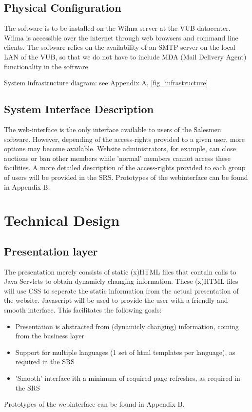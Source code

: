 \documentclass[a4paper, 12pt]{report}
\begin{document}
\section{Physical Configuration}
The software is to be installed on the Wilma server at the VUB datacenter. Wilma is accessible over the internet through web browsers and command line clients. The software relies on the availability of an SMTP server on the local LAN of the VUB, so that we do not have to include MDA (Mail Delivery Agent) functionality in the software.

System infrastructure diagram: see Appendix A, \ref{fig_infrastructure}


\section{System Interface Description}
The web-interface is the only interface available to users of the Salesmen software. However, depending of the access-rights provided to a given user, more options may become available. Website administrators, for example, can close auctions or ban other members while 'normal' members cannot access these facilities. A more detailed description of the access-rights provided to each group of users will be provided in the SRS.
Prototypes of the webinterface can be found in Appendix B.
\pagebreak
\chapter{Technical Design \label{Technical Design}}
\section{Presentation layer}
The presentation merely consists of static (x)HTML files that contain calls to Java Servlets to obtain dynamicly changing information. These (x)HTML files will use CSS to seperate the static information from the actual presentation of the website. Javascript will be used to provide the user with a friendly and smooth interface.
This facilitates the following goals:
\begin{itemize}
\item Presentation is abstracted from (dynamicly changing) information, coming from the business layer
\item Support for multiple languages (1 set of html templates per language), as required in the SRS
\item 'Smooth' interface ith a minimum of required page refreshes, as required in the SRS
\end{itemize}
Prototypes of the webinterface can be found in Appendix B.
\end{document}
